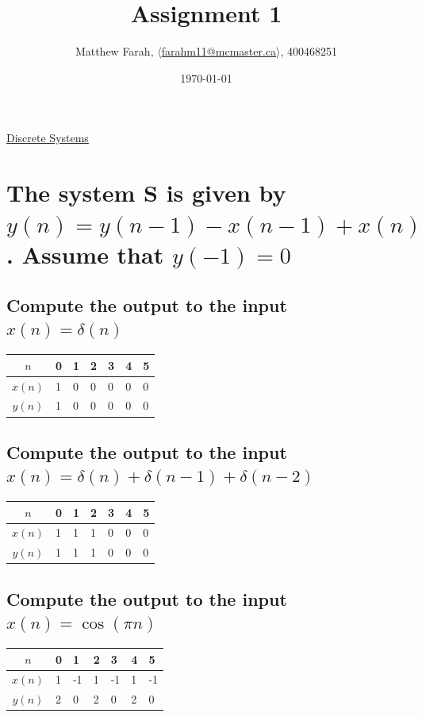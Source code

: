\documentclass{article}
\title{Assignment 1}
\author{Matthew Farah, \href{mailto:farahm11@mcmaster.ca}{$\langle$farahm11@mcmaster.ca$\rangle$}, 400468251}
\date{\today}
\renewcommand{\thesubsection}{\thesection.\alph{subsection}}
\begin{document}
\maketitle
\pagestyle{fancy}

\begin{center}
	\Large{\underline{Discrete Systems}}
\end{center}
\section[Question ~\thesection]{The system S is given by $y(n) = y(n - 1) - x(n - 1) + x(n)$. Assume that $y(-1) = 0$}

\subsection[~\thesubsection]{Compute the output to the input $x(n) = \delta(n)$}

\begin{tabularx}{\linewidth}{| c || Y Y Y Y Y Y |}
	\hline
	$n$ & 0 & 1 & 2 & 3 & 4 & 5 \\
	\hline
	$x(n)$ & 1 & 0 & 0 & 0 & 0 & 0 \\
	$y(n)$ & 1 & 0 & 0 & 0 & 0 & 0 \\
	\hline
\end{tabularx}

\subsection[~\thesubsection]{Compute the output to the input $x(n) = \delta(n) + \delta(n - 1) + \delta(n - 2)$}

\begin{tabularx}{\linewidth}{| c || Y Y Y Y Y Y |}
	\hline
	$n$ & 0 & 1 & 2 & 3 & 4 & 5 \\
	\hline
	$x(n)$ & 1 & 1 & 1 & 0 & 0 & 0 \\
	$y(n)$ & 1 & 1 & 1 & 0 & 0 & 0 \\
	\hline
\end{tabularx}

\subsection[~\thesubsection]{Compute the output to the input $x(n) = \cos({\pi}n)$}

\begin{tabularx}{\linewidth}{| c || Y Y Y Y Y Y |}
	\hline
	$n$ & 0 & 1 & 2 & 3 & 4 & 5 \\
	\hline
	$x(n)$ & 1 & -1 & 1 & -1 & 1 & -1 \\
	$y(n)$ & 2 & 0 & 2 & 0 & 2 & 0 \\
	\hline
\end{tabularx}
\end{document}
